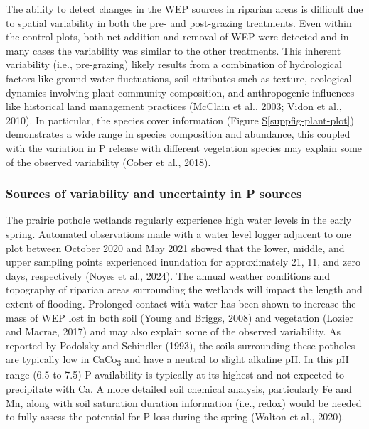 \documentclass[
]{agujournal2019}
\newcommand*\quartosuppfigref[1]{Figure \hyperref[#1]{S\ref{#1}}}
\begin{document}
The ability to detect changes in the WEP sources in riparian areas is
difficult due to spatial variability in both the pre- and post-grazing
treatments. Even within the control plots, both net addition and removal
of WEP were detected and in many cases the variability was similar to
the other treatments. This inherent variability (i.e., pre-grazing)
likely results from a combination of hydrological factors like ground
water fluctuations, soil attributes such as texture, ecological dynamics
involving plant community composition, and anthropogenic influences like
historical land management practices (McClain et al., 2003; Vidon et
al., 2010). In particular, the species cover information
(\quartosuppfigref{suppfig-plant-plot}) demonstrates a wide range in
species composition and abundance, this coupled with the variation in P
release with different vegetation species may explain some of the
observed variability (Cober et al., 2018).

\subsubsection{Sources of variability and uncertainty in P
sources}\label{sources-of-variability-and-uncertainty-in-p-sources}

The prairie pothole wetlands regularly experience high water levels in
the early spring. Automated observations made with a water level logger
adjacent to one plot between October 2020 and May 2021 showed that the
lower, middle, and upper sampling points experienced inundation for
approximately 21, 11, and zero days, respectively (Noyes et al., 2024).
The annual weather conditions and topography of riparian areas
surrounding the wetlands will impact the length and extent of flooding.
Prolonged contact with water has been shown to increase the mass of WEP
lost in both soil (Young and Briggs, 2008) and vegetation (Lozier and
Macrae, 2017) and may also explain some of the observed variability. As
reported by Podolsky and Schindler (1993), the soils surrounding these
potholes are typically low in CaCo\textsubscript{3} and have a neutral
to slight alkaline pH. In this pH range (6.5 to 7.5) P availability is
typically at its highest and not expected to precipitate with Ca. A more
detailed soil chemical analysis, particularly Fe and Mn, along with soil
saturation duration information (i.e., redox) would be needed to fully
assess the potential for P loss during the spring (Walton et al., 2020).
\end{document}
